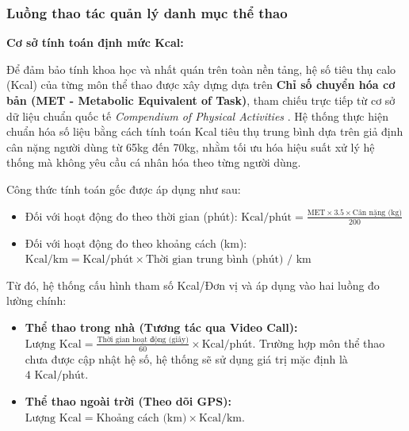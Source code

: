 \subsubsection{Luồng thao tác quản lý danh mục thể thao}

\textbf{Cơ sở tính toán định mức Kcal:}

Để đảm bảo tính khoa học và nhất quán trên toàn nền tảng, hệ số tiêu thụ calo (Kcal) của từng môn thể thao được xây dựng dựa trên \textbf{Chỉ số chuyển hóa cơ bản (MET - Metabolic Equivalent of Task)}, tham chiếu trực tiếp từ cơ sở dữ liệu chuẩn quốc tế \textit{Compendium of Physical Activities} \cite{CompendiumPhysicalActivities}. Hệ thống thực hiện chuẩn hóa số liệu bằng cách tính toán Kcal tiêu thụ trung bình dựa trên giả định cân nặng người dùng từ 65kg đến 70kg, nhằm tối ưu hóa hiệu suất xử lý hệ thống mà không yêu cầu cá nhân hóa theo từng người dùng.

Công thức tính toán gốc được áp dụng như sau:
\begin{itemize}
    \item Đối với hoạt động đo theo thời gian (phút): $\text{Kcal/phút} = \frac{\text{MET} \times 3.5 \times \text{Cân nặng (kg)}}{200}$
    \item Đối với hoạt động đo theo khoảng cách (km): $\text{Kcal/km} = \text{Kcal/phút} \times \text{Thời gian trung bình (phút) / km}$
\end{itemize}

Từ đó, hệ thống cấu hình tham số Kcal/Đơn vị và áp dụng vào hai luồng đo lường chính:
\begin{itemize}
    \item \textbf{Thể thao trong nhà (Tương tác qua Video Call):} $\text{Lượng Kcal} = \frac{\text{Thời gian hoạt động (giây)}}{60} \times \text{Kcal/phút}$. Trường hợp môn thể thao chưa được cập nhật hệ số, hệ thống sẽ sử dụng giá trị mặc định là $4\text{ Kcal/phút}$.
    \item \textbf{Thể thao ngoài trời (Theo dõi GPS):} $\text{Lượng Kcal} = \text{Khoảng cách (km)} \times \text{Kcal/km}$.
\end{itemize}

